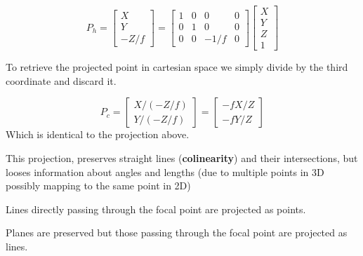 \documentclass{article}
\begin{document}
{    \begin{equation}
        P_{h} =
        \begin{bmatrix}
            X \\ Y \\ -Z/f
        \end{bmatrix}
        =
        \begin{bmatrix}
            1 & 0 & 0 & 0 \\
            0 & 1 & 0 & 0 \\
            0 & 0 & -1/f & 0 
        \end{bmatrix}
        \begin{bmatrix}
            X \\ Y \\ Z \\ 1
        \end{bmatrix}
    \end{equation}

    To retrieve the projected point in cartesian space we simply divide by the third coordinate and discard it.

    \begin{equation}
        P_{c} = 
        \begin{bmatrix}
            X / (-Z/f) \\ Y / (-Z/f)
        \end{bmatrix}
        = 
        \begin{bmatrix}
            -fX/Z \\ -fY/Z
        \end{bmatrix}
    \end{equation}
    Which is identical to the projection above.

    This projection, preserves straight lines (\textbf{colinearity}) and their intersections, but looses information about angles and lengths (due to multiple points in 3D possibly mapping to the same point in 2D)
    
    Lines directly passing through the focal point are projected as points.
    
    Planes are preserved but those passing through the focal point are projected as lines.
}
\end{document}
